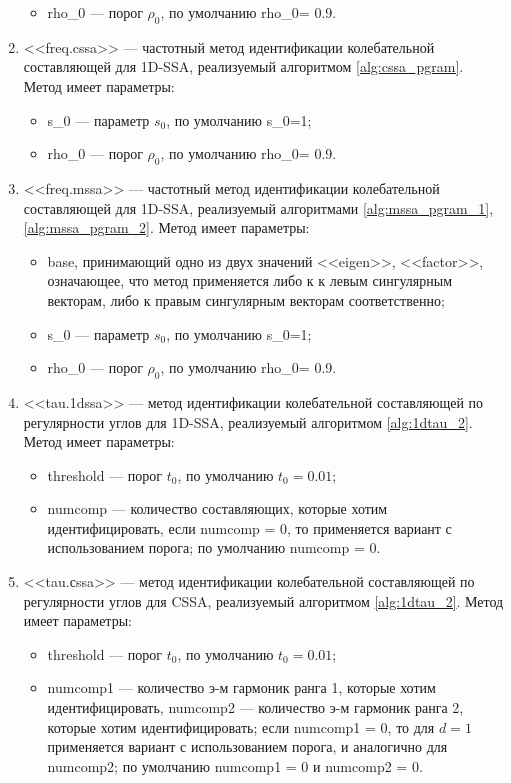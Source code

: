 \documentclass[specialist,
               substylefile = spbu.rtx,
               subf,href,colorlinks=true, 12pt]{disser}
\begin{document}
\begin{enumerate}
\begin{itemize}
\item rho\_0 --- порог $\rho_0$, по умолчанию rho\_0= 0.9.
\end{itemize} 
\item <<freq.cssa>> --- частотный метод идентификации колебательной составляющей для 1D-SSA, реализуемый алгоритмом \ref{alg:cssa_pgram}. Метод имеет параметры:
\begin{itemize}
\item s\_0 --- параметр $s_0$, по умолчанию s\_0=1;
\item rho\_0 --- порог $\rho_0$, по умолчанию rho\_0= 0.9.
\end{itemize} 
\item <<freq.mssa>> --- частотный метод идентификации колебательной составляющей для 1D-SSA, реализуемый алгоритмами \ref{alg:mssa_pgram_1}, \ref{alg:mssa_pgram_2}. Метод имеет параметры:
\begin{itemize}
\item base, принимающий одно из двух значений  <<eigen>>, <<factor>>, означающее, что метод применяется либо к  к левым сингулярным векторам, либо к правым сингулярным векторам соответственно;
\item s\_0 --- параметр $s_0$, по умолчанию s\_0=1;
\item rho\_0 --- порог $\rho_0$, по умолчанию rho\_0= 0.9.
\end{itemize} 
\item <<tau.1dssa>> --- метод идентификации колебательной составляющей по регулярности углов для 1D-SSA, реализуемый алгоритмом \ref{alg:1dtau_2}. Метод имеет параметры:
\begin{itemize}
\item threshold --- порог $t_0$, по умолчанию $t_0=0.01$;
\item numcomp --- количество составляющих, которые хотим идентифицировать, если numcomp = 0, то применяется вариант с использованием порога; по умолчанию numcomp = 0.
\end{itemize} 
\item <<tau.сssa>> --- метод идентификации колебательной составляющей по регулярности углов для CSSA, реализуемый алгоритмом \ref{alg:1dtau_2}. Метод имеет параметры:
\begin{itemize}
\item threshold --- порог $t_0$, по умолчанию $t_0=0.01$;
\item numcomp1 --- количество э-м гармоник ранга 1, которые хотим идентифицировать, numcomp2 --- количество э-м гармоник ранга 2, которые хотим идентифицировать; если numcomp1 = 0, то для $d=1$ применяется вариант с использованием порога, и аналогично для numcomp2; по умолчанию numcomp1 = 0 и numcomp2 = 0.

\end{itemize}
\end{enumerate}
\end{document}

